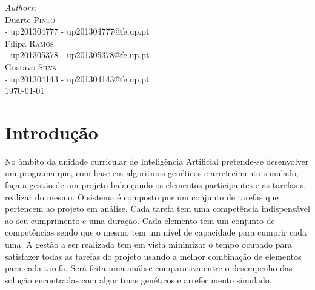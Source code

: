 \begin{titlepage}


\Large \emph{Authors:}\\[0.5cm] \normalsize
Duarte \textsc{Pinto}\\[0cm] - up201304777 
- up201304777@fe.up.pt\\[0cm]
Filipa \textsc{Ramos}\\[0cm] - up201305378
- up201305378@fe.up.pt\\[0cm] 
Gustavo \textsc{Silva}\\[0cm] - up201304143
- up201304143@fe.up.pt\\[5cm] %


{\large \today}\\[0cm] %


\tableofcontents


\section{Introdução} 

\justify\normalsize
No âmbito da unidade curricular de Inteligência Artificial pretende-se desenvolver um programa que, com base em algoritmos genéticos e arrefecimento simulado, faça a gestão de um projeto balançando os elementos participantes e as tarefas a realizar do mesmo. O sistema é composto por um conjunto de tarefas que pertencem ao projeto em análise. Cada tarefa tem uma competência indispensável ao seu cumprimento e uma duração. Cada elemento tem um conjunto de competências sendo que o mesmo tem um nível de capacidade para cumprir cada uma. A gestão a ser realizada tem em vista minimizar o tempo ocupado para satisfazer todas as tarefas do projeto usando a melhor combinação de elementos para cada tarefa. Será feita uma análise comparativa entre o desempenho das solução encontradas com algoritmos genéticos e arrefecimento simulado. 


\end{titlepage}
